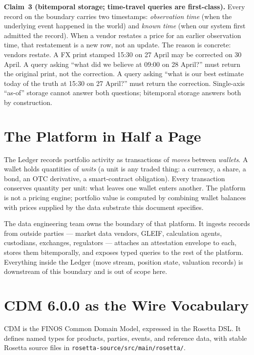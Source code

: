 \documentclass[11pt,a4paper]{article}
\begin{document}
\textbf{Claim~3 (bitemporal storage; time-travel queries are first-class).} Every record on the boundary carries two timestamps: \emph{observation time} (when the underlying event happened in the world) and \emph{known time} (when our system first admitted the record). When a vendor restates a price for an earlier observation time, that restatement is a new row, not an update. The reason is concrete: vendors restate. A FX print stamped 15:30 on 27 April may be corrected on 30 April. A query asking ``what did we believe at 09:00 on 28 April?'' must return the original print, not the correction. A query asking ``what is our best estimate today of the truth at 15:30 on 27 April?'' must return the correction. Single-axis ``as-of'' storage cannot answer both questions; bitemporal storage answers both by construction.

\section{The Platform in Half a Page}

The Ledger records portfolio activity as transactions of \emph{moves} between \emph{wallets}. A wallet holds quantities of \emph{units} (a unit is any traded thing: a currency, a share, a bond, an OTC derivative, a smart-contract obligation). Every transaction conserves quantity per unit: what leaves one wallet enters another. The platform is not a pricing engine; portfolio value is computed by combining wallet balances with prices supplied by the data substrate this document specifies.

The data engineering team owns the boundary of that platform. It ingests records from outside parties --- market data vendors, GLEIF, calculation agents, custodians, exchanges, regulators --- attaches an attestation envelope to each, stores them bitemporally, and exposes typed queries to the rest of the platform. Everything inside the Ledger (move stream, position state, valuation records) is downstream of this boundary and is out of scope here.

\section{CDM 6.0.0 as the Wire Vocabulary}

CDM is the FINOS Common Domain Model, expressed in the Rosetta DSL. It defines named types for products, parties, events, and reference data, with stable Rosetta source files in \texttt{rosetta-source/src/main/rosetta/}.
\end{document}
